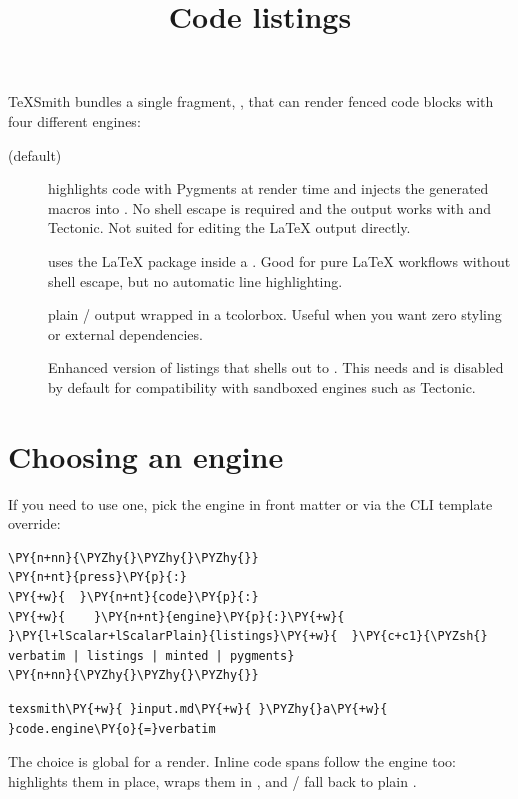 \documentclass[a4paper,twoside]{article}
\title{Code listings}
\author{}\date{}
\begin{document}
\maketitle
TeXSmith bundles a single fragment, , that can render fenced code blocks with four different engines:
\begin{description}
\item[{ (default)}] highlights code with Pygments at render time and injects the generated macros into . No shell escape is required and the output works with  and Tectonic. Not suited for editing the \LaTeX{} output directly.
\item[{}] uses the \LaTeX{}  package inside a . Good for pure \LaTeX{} workflows without shell escape, but no automatic line highlighting.
\item[{}] plain / output wrapped in a tcolorbox. Useful when you want zero styling or external dependencies.
\item[{}] Enhanced version of listings that shells out to . This needs  and is disabled by default for compatibility with sandboxed engines such as Tectonic.
\end{description}
\section{Choosing an engine}
If you need to use one, pick the engine in front matter or via the CLI template override:
\begin{tscode}[lang=yaml, engine=pygments]
\begin{Verbatim}[commandchars=\\\{\},breaklines, breakanywhere, commandchars=\\\{\}]
\PY{n+nn}{\PYZhy{}\PYZhy{}\PYZhy{}}
\PY{n+nt}{press}\PY{p}{:}
\PY{+w}{  }\PY{n+nt}{code}\PY{p}{:}
\PY{+w}{    }\PY{n+nt}{engine}\PY{p}{:}\PY{+w}{ }\PY{l+lScalar+lScalarPlain}{listings}\PY{+w}{  }\PY{c+c1}{\PYZsh{} verbatim | listings | minted | pygments}
\PY{n+nn}{\PYZhy{}\PYZhy{}\PYZhy{}}
\end{Verbatim}
\end{tscode}
\begin{tscode}[lang=bash, engine=pygments]
\begin{Verbatim}[commandchars=\\\{\},breaklines, breakanywhere, commandchars=\\\{\}]
texsmith\PY{+w}{ }input.md\PY{+w}{ }\PYZhy{}a\PY{+w}{ }code.engine\PY{o}{=}verbatim
\end{Verbatim}
\end{tscode}
The choice is global for a render. Inline code spans follow the engine too:  highlights them in place,  wraps them in , and / fall back to plain .
\end{document}
